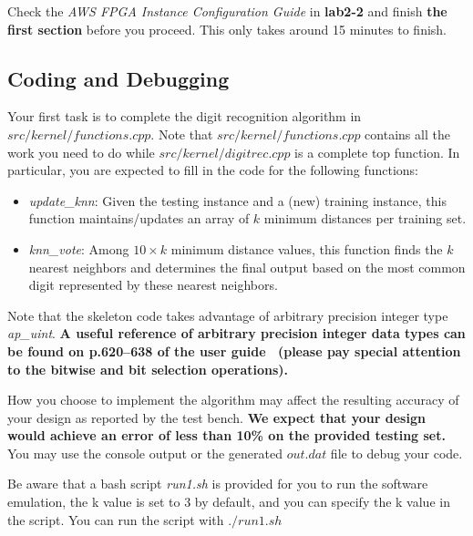 \documentclass[paper=letter, fontsize=10pt]{scrartcl} %
\numberwithin{equation}{section} %
\numberwithin{figure}{section} %
\numberwithin{table}{section} %
\def\awstutorial{\textit{AWS FPGA Instance Configuration Guide }}
\begin{document}
Check the \awstutorial in \textbf{lab2-2} and finish \textbf{the first section} before you proceed. This only takes around 15 minutes to finish.

\subsection{Coding and Debugging}

Your first task is to complete the digit recognition algorithm in $src/kernel/functions.cpp$. Note that $src/kernel/functions.cpp$ contains all the work you need to do while $src/kernel/digitrec.cpp$ is a complete top function. 
In particular, you are expected to fill in the code for the following functions:
\begin{itemize}
\item \textit{update\_knn}: Given the testing instance and a (new) training instance, this function maintains/updates an array of $k$ minimum distances per training set.
\item \textit{knn\_vote}: Among $10 \times k$ minimum distance values, this function finds the $k$ nearest neighbors and determines the final output based on the most common digit represented by these nearest neighbors.
\end{itemize}

Note that the skeleton code takes advantage of arbitrary precision integer type \textit{ap\_uint}. \textbf{A useful reference of arbitrary precision integer data types can be found on p.620--638 of the user guide~\cite{ug902} (please pay special attention to the bitwise and bit selection operations).}

How you choose to implement the algorithm may affect the resulting accuracy of your design as reported by the test bench. \textbf{We expect that your design would achieve an error of less than 10\% on the provided testing set.} You may use the console output or the generated $out.dat$ file to debug your code.

Be aware that a bash script \textit{run1.sh} is provided for you to run the software emulation, the k value is set to 3 by default, and you can specify the k value in the script. You can run the script with $./run1.sh$
\end{document}
